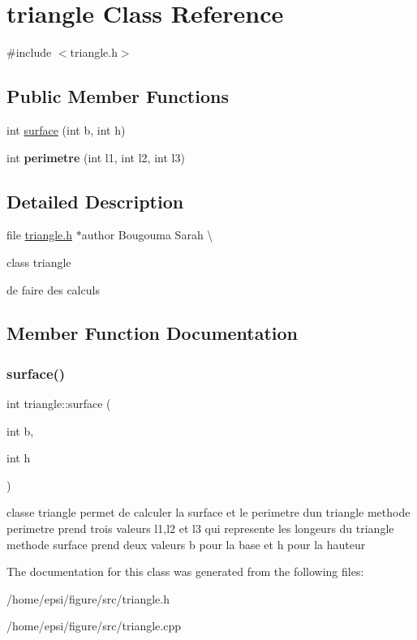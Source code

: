 \hypertarget{classtriangle}{}\section{triangle Class Reference}
\label{classtriangle}


{\ttfamily \#include $<$triangle.\+h$>$}

\subsection*{Public Member Functions}
\begin{DoxyCompactItemize}
\item 
int \hyperlink{classtriangle_a6164097c5853f019027814c17f3d1aa0}{surface} (int b, int h)
\item 
\mbox{\label{classtriangle_a0d7fc20d0c6cd9fb0bfd352af1dd2263}} 
int {\bfseries perimetre} (int l1, int l2, int l3)
\end{DoxyCompactItemize}


\subsection{Detailed Description}
file \hyperlink{triangle_8h_source}{triangle.\+h} $\ast$author Bougouma Sarah \textbackslash{}

class triangle

de faire des calculs 

\subsection{Member Function Documentation}
\mbox{\label{classtriangle_a6164097c5853f019027814c17f3d1aa0}} 
\subsubsection{\texorpdfstring{surface()}{surface()}}
{\footnotesize\ttfamily int triangle\+::surface (\begin{DoxyParamCaption}\item[{int}]{b,  }\item[{int}]{h }\end{DoxyParamCaption})}

classe triangle permet de calculer la surface et le perimetre d\textquotesingle{}un triangle  methode perimetre prend trois valeurs l1,l2 et l3 qui represente les longeurs du triangle  methode surface prend deux valeurs b pour la base et h pour la hauteur 

The documentation for this class was generated from the following files\+:\begin{DoxyCompactItemize}
\item 
/home/epsi/figure/src/triangle.\+h\item 
/home/epsi/figure/src/triangle.\+cpp\end{DoxyCompactItemize}
